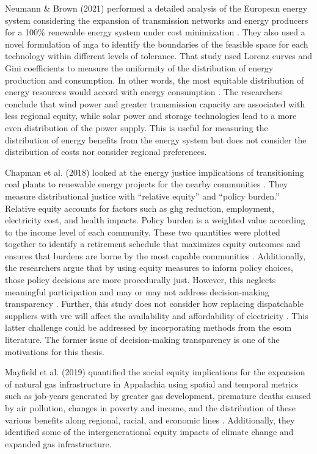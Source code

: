 Neumann \& Brown (2021) performed a detailed analysis of the European energy
system considering the expansion of transmission networks and energy producers
for a 100\% renewable energy system under cost minimization
\cite{neumann_near-optimal_2021}. They also used a novel formulation of \ac{mga}
to identify the boundaries of the feasible space for each technology within
different levels of tolerance. That study used Lorenz curves and Gini
coefficients to measure the uniformity of the distribution of energy production
and consumption. In other words, the most equitable distribution of energy
resources would accord with energy consumption \cite{neumann_near-optimal_2021}.
The researchers conclude that wind power and greater transmission capacity are
associated with less regional equity, while solar power and storage technologies
lead to a more even distribution of the power supply. This is useful for
measuring the distribution of energy benefits from the energy system but does
not consider the distribution of costs nor consider regional preferences. 

Chapman et al. (2018) looked at the energy justice implications of transitioning
coal plants to renewable energy projects for the nearby communities
\cite{chapman_prioritizing_2018}. They measure distributional justice with
``relative equity'' and ``policy burden.'' Relative equity accounts for factors
such as \ac{ghg} reduction, employment, electricity cost, and health impacts.
Policy burden is a weighted value according to the income level of each
community. These two quantities were plotted together to identify a retirement
schedule that maximizes equity outcomes and ensures that burdens are borne by
the most capable communities \cite{chapman_prioritizing_2018}. Additionally, the
researchers argue that by using equity measures to inform policy choices, those
policy decisions are more procedurally just. However, this neglects meaningful
participation and may or may not address decision-making transparency
\cite{sovacool_energy_2015}. Further, this study does not consider how replacing
dispatchable suppliers with \ac{vre} will affect the availability and
affordability of electricity \cite{sovacool_energy_2015}. This latter challenge
could be addressed by incorporating methods from the \ac{esom} literature. The
former issue of decision-making transparency is one of the motivations for this
thesis.

Mayfield et al. (2019) quantified the social equity implications for the
expansion of natural gas infrastructure in Appalachia using spatial and temporal
metrics such as job-years generated by greater gas development, premature deaths
caused by air pollution, changes in poverty and income, and the distribution of
these various benefits along regional, racial, and economic lines
\cite{mayfield_quantifying_2019}. Additionally, they identified some of the
intergenerational equity impacts of climate change and expanded gas
infrastructure. 

